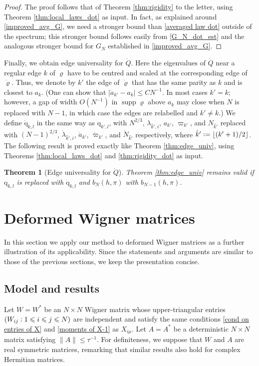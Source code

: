 \documentclass[11pt]{article} %
\numberwithin{equation}{section}
\numberwithin{figure}{section}
\theoremstyle{plain} %
\newtheorem{theorem}{Theorem}[section]
\theoremstyle{definition} %
\newcommand{\f}[1]{\boldsymbol{\mathrm{#1}}} %
\newcommand{\col}{\mathrel{\vcenter{\baselineskip0.75ex \lineskiplimit0pt \hbox{.}\hbox{.}}}}
\newcommand*{\deq}{\mathrel{\vcenter{\baselineskip0.65ex \lineskiplimit0pt \hbox{.}\hbox{.}}}=}
\renewcommand{\leq}{\leqslant}
\newcommand{\floor}[1] {\lfloor {#1} \rfloor}
\newcommand{\abs}[1]{\lvert #1 \rvert}
\newcommand{\norm}[1]{\lVert #1 \rVert}
\DeclareMathOperator{\supp}{supp}
\begin{document}
\begin{proof}
The proof follows that of Theorem \ref{thm:rigidity} to the letter, using Theorem \ref{thm:local_laws_dot} as input. In fact, as explained around \eqref{improved_avg_G}, we need a stronger bound than \eqref{averaged law dot} outside of the spectrum; this stronger bound follows easily from \eqref{G_N_dot_est} and the analogous stronger bound for $G_N$ established in \eqref{improved_avg_G}.
\end{proof}

Finally, we obtain edge universality for $\dot Q$. Here the eigenvalues of $\dot Q$ near a regular edge $k$ of $\varrho$ have to be centred and scaled at the corresponding edge of $\dot \varrho$. Thus, we denote by $k'$ the edge of $\dot \varrho$ that has the same parity as $k$ and is closest to $a_k$. (One can show that $\abs{\dot a_{k'} - a_k} \leq C N^{-1}$. In most cases $k' = k$; however, a gap of width $O(N^{-1})$ in $\supp \varrho$ above $a_k$ may close when $N$ is replaced with $N - 1$, in which case the edges are relabelled and $k' \neq k$.) We define $\dot {\f q}_{k,l}$ in the same way as $\f q_{k',l}$, with $N^{2/3}$, $\lambda_{\hat k', i}$, $a_{k'}$, $\varpi_{k'}$, and $N_{\hat k'}$ replaced with $(N - 1)^{2/3}$, $\dot \lambda_{\hat k', i}$, $\dot a_{k'}$, $\dot \varpi_{k'}$, and $\dot N_{\hat k'}$ respectively, where $\hat k' \deq \floor{(k' + 1)/2}$. The following result is proved exactly like Theorem \ref{thm:edge_univ}, using Theorems \ref{thm:local_laws_dot} and \ref{thm:rigidity_dot} as input.

\begin{theorem}[Edge universality for $\dot Q$]
Theorem \ref{thm:edge_univ} remains valid if $\f q_{k,l}$ is replaced with $\dot {\f q}_{k,l}$ and $b_N(h,\pi)$ with $b_{N - 1}(h,\pi)$.
\end{theorem}

\section{Deformed Wigner matrices} \label{sec:Wig} 

In this section we apply our method to deformed Wigner matrices as a further illustration of its applicability. Since the statements and arguments are similar to those of the previous sections, we keep the presentation concise.

\subsection{Model and results}
Let $W = W^*$ be an $N \times N$ Wigner matrix whose upper-triangular entries $(W_{ij} \col 1 \leq i \leq j \leq N)$ are independent and satisfy the same conditions \eqref{cond on entries of X} and \eqref{moments of X-1} as $X_{i\mu}$. Let 
$A = A^*$ be a deterministic $N \times N$ matrix satisfying $\norm{A} \leq \tau^{-1}$. For definiteness, we suppose that $W$ and $A$ are real symmetric matrices, remarking that similar results also hold for complex Hermitian matrices.
\end{document}
